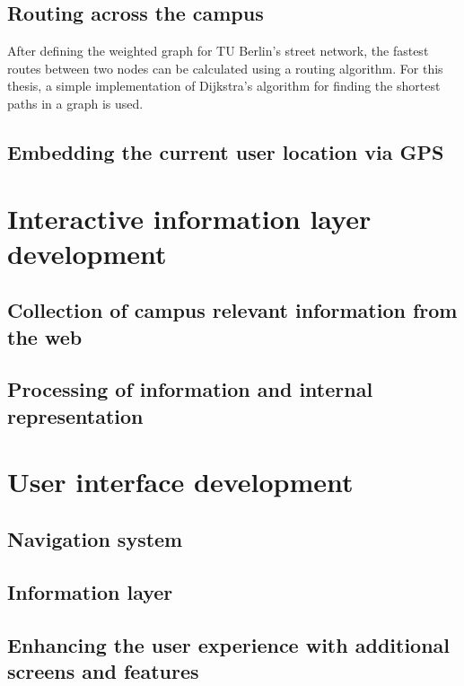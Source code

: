 \subsection{Routing across the campus}
After defining the weighted graph for TU Berlin's street network, the fastest routes between two nodes can be calculated using a routing algorithm. For this thesis, a simple implementation of Dijkstra's algorithm for finding the shortest paths in a graph is used.

\subsection{Embedding the current user location via GPS}

\section{Interactive information layer development}
\subsection{Collection of campus relevant information from the web}
\subsection{Processing of information and internal representation}

\section{User interface development}
\subsection{Navigation system}
\subsection{Information layer}
\subsection{Enhancing the user experience with additional screens and features}